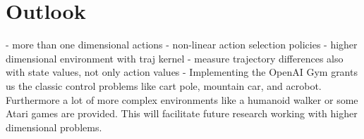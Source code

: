 \chapter{Outlook}
\label{chap:7}
%
- more than one dimensional actions
- non-linear action selection policies
- higher dimensional environment with traj kernel
- measure trajectory differences also with state values, not only action values
- Implementing the OpenAI Gym grants us the classic control problems like cart pole, mountain car, and acrobot. Furthermore a lot of more complex environments like a humanoid walker or some Atari games are provided\cite{DBLP:journals/corr/BrockmanCPSSTZ16}. This will facilitate future research working with higher dimensional problems.
